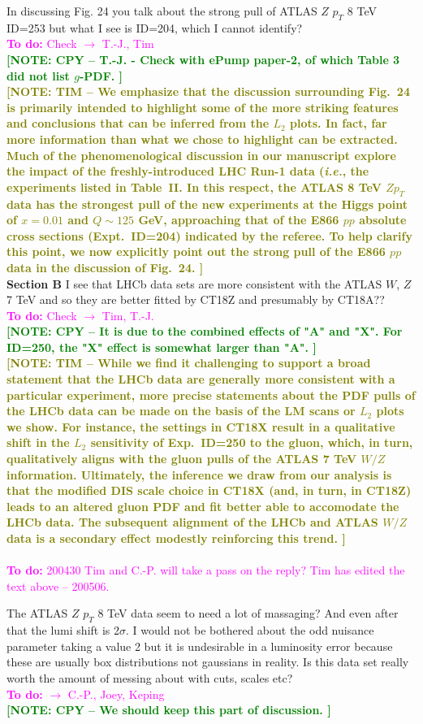 \documentclass[aps,prd,amsmath,nofootinbib,floatfix,fleqn]{revtex4}
\newcommand{\TODO}[1]{\textcolor{magenta}{
\quad\vspace{3pt} \\ {\bf To do:} #1 \\
}}
\newcommand{\NOTECPY}[1]{\textcolor{green}{ \bf[NOTE: CPY -- #1 ]}}
\newcommand{\NOTETIM}[1]{\textcolor{olive}{ \bf[NOTE: TIM -- #1 ]}}
\begin{document}
\noindent
In discussing Fig. 24 you talk about the strong pull of ATLAS $Z$ $p_T$ 8 TeV ID=253 but what I see is ID=204, which I cannot identify?  
\TODO{Check $\to$ T.-J., Tim}
\NOTECPY{T.-J. - Check with ePump paper-2, of which Table 3 did not list $g$-PDF. }\\
%
\NOTETIM{We emphasize that the discussion surrounding Fig.~24 is primarily intended to highlight some of the more striking features
and conclusions that can be inferred from the $L_2$ plots.  In fact, far more information than what we chose to highlight can be
extracted.  Much of the phenomenological discussion in our manuscript explore the impact of the freshly-introduced LHC
Run-1 data ({\it i.e.}, the experiments listed in Table~II.  In this respect, the ATLAS 8 TeV $Z p_T$ data has the strongest
pull of the new experiments at the Higgs point of $x=0.01$ and $Q\!\sim\!125$ GeV, approaching that of the E866 $pp$ absolute
cross sections (Expt.~ID=204) indicated by the referee.  To help clarify this point, we now explicitly point out the strong
pull of the E866 $pp$ data in the discussion of Fig.~24.}\\

\noindent
{\bf Section B}
I see that LHCb data sets are more consistent with the ATLAS $W$, $Z$ 7 TeV and so they are better fitted by CT18Z and presumably by CT18A??
%
\TODO{Check $\to$ Tim, T.-J.}
\NOTECPY{It is due to the combined effects of "A" and "X". For ID=250, the "X" effect is somewhat larger than "A".}\\
%
\NOTETIM{While we find it challenging to support a broad statement that the LHCb data are generally more consistent with a particular experiment, more precise statements about the PDF pulls of the LHCb data can be made on the basis of the LM scans
or $L_2$ plots we show.  For instance, the settings in CT18X result in a qualitative shift in the $L_2$ sensitivity of Exp.~ID=250 to
the gluon, which, in turn, qualitatively aligns with the gluon pulls of the ATLAS 7 TeV $W/Z$ information.  Ultimately, the inference we draw from our analysis is that the modified
DIS scale choice in CT18X (and, in turn, in CT18Z) leads to an altered gluon PDF and fit better
able to accomodate the LHCb data. The subsequent alignment of the LHCb and ATLAS $W/Z$ data
is a secondary effect modestly reinforcing this trend.}\\
\TODO{200430 Tim and C.-P. will take a pass on the reply? Tim has edited the text above -- 200506.}

\noindent
The ATLAS $Z$ $p_T$ 8 TeV data seem to need a lot of massaging? And even after that the lumi shift is 2$\sigma$. I would not be bothered about the odd nuisance parameter taking a value 2 but it is undesirable in a luminosity error because these are usually box distributions not gaussians in reality. Is this data set really worth the amount of messing about with cuts, scales etc?  
\TODO{$\to$ C.-P., Joey, Keping}
\NOTECPY{We should keep this part of discussion.}\\
\end{document}
